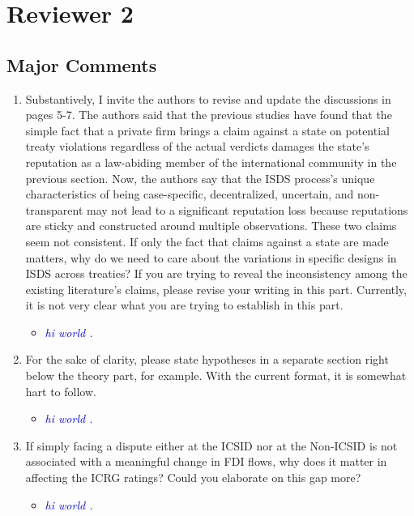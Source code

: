 \section{Reviewer 2}

\subsection{Major Comments}

\begin{enumerate}
	\item Substantively, I invite the authors to revise and update the discussions in pages 5-7. The authors said that the previous studies have found that the simple fact that a private firm brings a claim against a state on potential treaty violations regardless of the actual verdicts damages the state’s reputation as a law-abiding member of the international community in the previous section. Now, the authors say that the ISDS process’s unique characteristics of being case-specific, decentralized, uncertain, and non-transparent may not lead to a significant reputation loss because reputations are sticky and constructed around multiple observations. These two claims seem not consistent. If only the fact that claims against a state are made matters, why do we need to care about the variations in specific designs in ISDS across treaties? If you are trying to reveal the inconsistency among the existing literature’s claims, please revise your writing in this part. Currently, it is not very clear what you are trying to establish in this part.
	\begin{itemize}
		\item \textcolor{blue}{ \emph{ hi world . }}
	\end{itemize}
	\item For the sake of clarity, please state hypotheses in a separate section right below the theory part, for example. With the current format, it is somewhat hart to follow.	
	\begin{itemize}
		\item \textcolor{blue}{ \emph{ hi world . }}
	\end{itemize}
	\item If simply facing a dispute either at the ICSID nor at the Non-ICSID is not associated with a meaningful change in FDI flows, why does it matter in affecting the ICRG ratings? Could you elaborate on this gap more?	
	\begin{itemize}
		\item \textcolor{blue}{ \emph{ hi world . }}

\end{itemize}
\end{enumerate}
